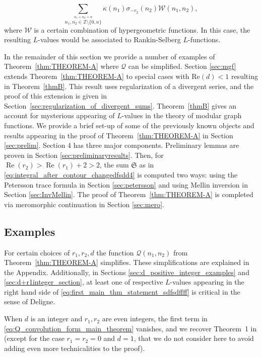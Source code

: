 \documentclass[]{article}
\newcommand{\mathcalSsumdef}{\mathfrak{S}}
\begin{document}
\begin{equation}
    \sum_{\stackrel{n_1+n_2=n}{n_1, n_2 \in \mathbb{Z} \setminus \{ 0, n\}  }}  		   \kappa(n_1) \sigma_{-r_2}(n_2)   \mathcal{W}(n_1,n_2),
\end{equation}
where $\mathcal{W}$ is a certain combination of hypergeometric functions. In this case, the resulting $L$-values would be associated to Rankin-Selberg $L$-functions. 


In the remainder of this section we provide a number of examples of Theorem~\ref{thm:THEOREM-A} where $\mathcal{Q}$ can be simplified. Section \ref{sec:mgf} extends Theorem~\ref{thm:THEOREM-A} to special cases with $\text{Re}(d)<1$ resulting in Theorem~\ref{thmB}. This result uses regularization of a divergent series, and the proof of this extension is given in Section~\ref{sec:regularization_of_divergent_sums}. Theorem~\ref{thmB} gives an account for mysterious appearing of $L$-values  in the theory of modular graph functions. We provide a brief set-up of some of the previously known %
objects and results appearing in the proof of Theorem~\ref{thm:THEOREM-A} in Section \ref{sec:prelim}. Section 4 has three major components. Preliminary lemmas are proven in Section \ref{sec:preliminaryresults}. Then, for $\operatorname{Re}(r_2) > \operatorname{Re}(r_1) + 2 > 2$, the sum $\mathcalSsumdef$ as in \eqref{eq:integral_after_contour_changedfsdd4} is computed two ways: using the Petersson trace formula in Section \ref{sec:petersson} and using Mellin inversion in Section \ref{sec:InvMellin}. The proof of Theorem~\ref{thm:THEOREM-A} is completed via meromorphic continuation in Section \ref{sec:mero}. 






 

\subsection{Examples}\label{sec:Examples}

For certain choices of $r_1, r_2, d$  the function $\mathcal Q(n_1, n_2)$ from  Theorem~\ref{thm:THEOREM-A} simplifies. These simplifications are explained in the Appendix.
Additionally, in Sections \ref{sec:d_positive_integer_examples} and \ref{sec:d+r1integer_section}, at least one of respective $L$-values appearing in the right hand side of \eqref{eq:first_main_thm_statement_sdfsdffff} is critical in the sense of Deligne.

When $d$ is an integer and  $r_1, r_2$ are even integers, the first term in \eqref{eq:Q_convolution_form_main_theorem} vanishes, and we recover Theorem~1 in \cite{FKLR} (except for the case $r_1 = r_2 = 0$ and $d=1$, that we do not consider here to avoid adding even more technicalities to the proof).
\end{document}
